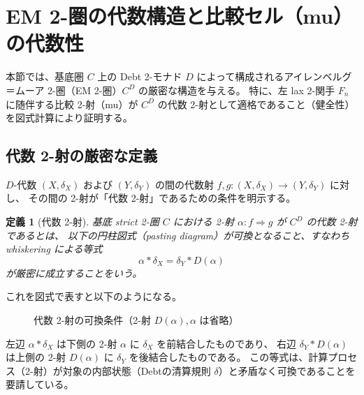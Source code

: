 \documentclass[a4paper,11pt]{ltjsarticle}
\newtheorem{definition}{定義}[section]
\begin{document}
\pdfstringdefDisableCommands{\def\_{}}
\pdfstringdefDisableCommands{\def\$ { }}
\pdfstringdefDisableCommands{\def\_{}}

\section[EM 2-圏の代数構造と比較セル（mu）の代数性]{EM 2-圏の代数構造と比較セル（mu）の代数性}

本節では、基底圏 $C$ 上の Debt 2-モナド $D$ によって構成されるアイレンベルグ＝ムーア 2-圏（EM 2-圏）$C^D$ の厳密な構造を与える。
特に、左 lax 2-関手 $F_n$ に随伴する比較 2-射（mu）が $C^D$ の代数 2-射として適格であること（健全性）を図式計算により証明する。

\subsection{代数 2-射の厳密な定義}

$D$-代数 $(X, \delta_X)$ および $(Y, \delta_Y)$ の間の代数射 $f, g: (X, \delta_X) \to (Y, \delta_Y)$ に対し、
その間の 2-射が「代数 2-射」であるための条件を明示する。

\begin{definition}[代数 2-射]
基底 strict 2-圏 $C$ における 2-射 $\alpha: f \Rightarrow g$ が $C^D$ の代数 2-射であるとは、
以下の円柱図式（pasting diagram）が可換となること、すなわち whiskering による等式
\[
  \alpha * \delta_X = \delta_Y * D(\alpha)
\]
が厳密に成立することをいう。
\end{definition}

これを図式で表すと以下のようになる。
\begin{figure}[ht]
\centering
{}
\caption{代数 2-射の可換条件（2-射 $D(\alpha),\alpha$ は省略）}
\end{figure}

左辺 $\alpha * \delta_X$ は下側の 2-射 $\alpha$ に $\delta_X$ を前結合したものであり、
右辺 $\delta_Y * D(\alpha)$ は上側の 2-射 $D(\alpha)$ に $\delta_Y$ を後結合したものである。
この等式は、計算プロセス（2-射）が対象の内部状態（Debtの清算規則 $\delta$）と矛盾なく可換であることを要請している。
\end{document}
